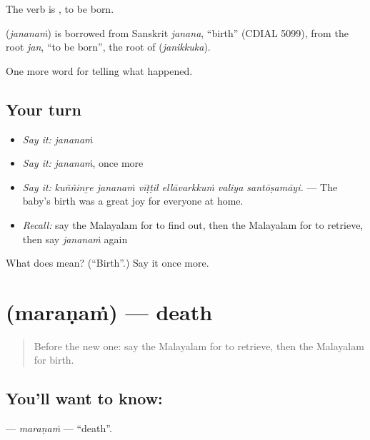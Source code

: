 The verb is , to be born.

\begin{cousinweb}
\textbf{} (\emph{jananaṁ}) is borrowed from Sanskrit \emph{janana}, \textquotedblleft{}birth\textquotedblright{} (CDIAL 5099), from the root \emph{jan}, \textquotedblleft{}to be born\textquotedblright{}, the root of  (\emph{janikkuka}).
\end{cousinweb}

\begin{grammarlens}[title={What you've built}]
One more word for telling what happened.
\end{grammarlens}

\subsection*{Your turn}
\begin{itemize}
\raggedright
  \item \emph{Say it:} \emph{jananaṁ}
  \item \emph{Say it:} \emph{jananaṁ}, once more
  \item \emph{Say it:} \emph{kuññinṟe jananaṁ vīṭṭil ellāvarkkuṁ valiya santōṣamāyi.} — The baby's birth was a great joy for everyone at home.
  \item \emph{Recall:} say the Malayalam for to find out, then the Malayalam for to retrieve, then say \emph{jananaṁ} again
\end{itemize}

\begin{tcolorbox}[breakable,colback=teal!4,colframe=teal!35!black,title={Before you move on}]
What does  mean? (\textquotedblleft{}Birth\textquotedblright{}.) Say it once more.
\end{tcolorbox}
\section[\texorpdfstring{\ml{മരണം} (maraṇaṁ)}{മരണം (maraṇaṁ)}]{ (maraṇaṁ) — death}

\label{lesson:ML-C384-maranam}



\begin{quote}
Before the new one: say the Malayalam for to retrieve, then the Malayalam for birth.
\end{quote}

\subsection*{You'll want to know: }
\textbf{} — \emph{maraṇaṁ} — \textquotedblleft{}death\textquotedblright{}.

